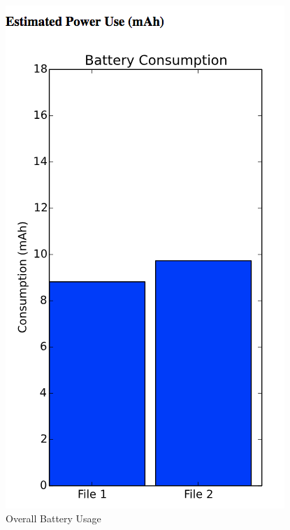 \begin{figure}[!h]
 	\begin{center}
		\includegraphics[scale=0.6]{diff1}
		\caption{Overall Battery Usage}
	\end{center}
\end{figure}

